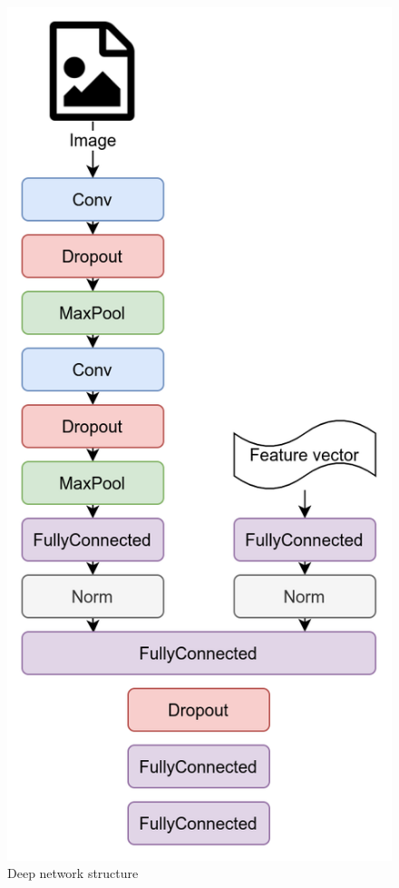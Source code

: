 \documentclass[10pt,a4paper]{article}
\begin{document}
\begin{figure}
    \includegraphics[width=0.9\linewidth]{Network.png}
    \caption{Deep network structure}
\end{figure}
\end{document}
